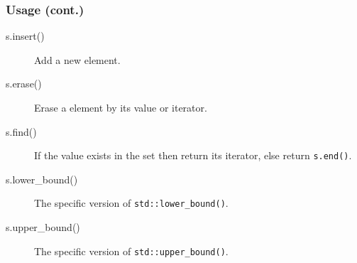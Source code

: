 \documentclass{beamer}
\begin{document}
\frame
{
	\frametitle{Usage (cont.)}
	
	\begin{description}
		\item[\ttfamily s.insert()] Add a new element.
		\item[\ttfamily s.erase()] Erase a element by its value or iterator.
		\item[\ttfamily s.find()] If the value exists in the set then return its iterator, else return \texttt{s.end()}.
		\item[\ttfamily s.lower\_bound()] The specific version of \texttt{std::lower\_bound()}.
		\item[\ttfamily s.upper\_bound()] The specific version of \texttt{std::upper\_bound()}.
	\end{description}
}
\end{document}
